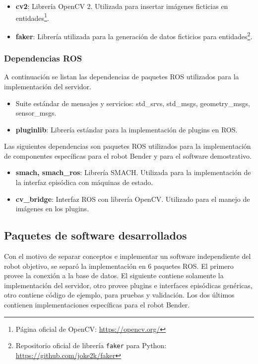 \begin{itemize}
\item {\bfseries cv2}: Librería OpenCV 2. Utilizada para insertar imágenes ficticias en entidades\footnote{Página oficial de OpenCV: \url{https://opencv.org/}}. 
\item {\bfseries faker}: Librería utilizada para la generación de datos ficticios para entidades\footnote{Repositorio oficial de librería \texttt{faker} para Python: \url{https://github.com/joke2k/faker}}.
\end{itemize}


\subsubsection{Dependencias ROS}

A continuación se listan las dependencias de paquetes ROS utilizados para la implementación del servidor.
\begin{itemize}
	\item Suite estándar de mensajes y servicios: std\_srvs, std\_msgs, geometry\_msgs, sensor\_msgs.
	\item {\bfseries pluginlib}: Librería estándar para la implementación de plugins en ROS.
\end{itemize}

Las siguientes dependencias son paquetes ROS utilizados para la implementación de componentes específicas para el robot Bender y para el software demostrativo.
\begin{itemize}
\item {\bfseries smach, smach\_ros}: Librería SMACH. Utilizada para la implementación de la interfaz episódica con máquinas de estado.
\item {\bfseries cv\_bridge}: Interfaz ROS con librería OpenCV. Utilizado para el manejo de imágenes en los plugins.
\end{itemize}


\subsection{Paquetes de software desarrollados}\label{sec:impl_packages}

Con el motivo de separar conceptos e implementar un software independiente del robot objetivo, se separó la implementación en 6 paquetes ROS. El primero provee la conexión a la base de datos. El siguiente contiene solamente la implementación del servidor, otro provee plugins e interfaces episódicas genéricas, otro contiene código de ejemplo, para pruebas y validación. Los dos últimos contienen implementaciones específicas para el robot Bender.

